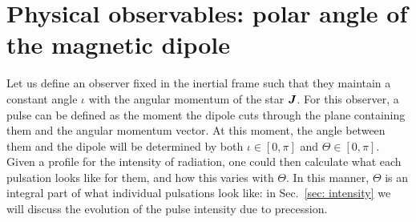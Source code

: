 \documentclass[../full_thesis/full_thesis.tex]{subfiles}
\begin{document}
%

\section{Physical observables: polar angle of the magnetic dipole}

Let us define an observer fixed in the inertial frame such that they
maintain a constant angle $\iota$ with the angular momentum of the star $\boldsymbol{J}$.
For this observer, a pulse can be defined as the moment the dipole cuts through
the plane containing them and the angular momentum vector. At this moment, the
angle between them and the dipole will be determined by both $\iota \in [0, \pi]$ and
$\Theta \in [0, \pi]$. Given a profile for the intensity of radiation, one could then
calculate what each pulsation looks like for them, and how this varies with
$\Theta$. In this manner, $\Theta$ is an integral part of what individual
pulsations look like: in Sec.~\ref{sec: intensity} we will discuss the evolution
of the pulse intensity due to precession.
\end{document}
